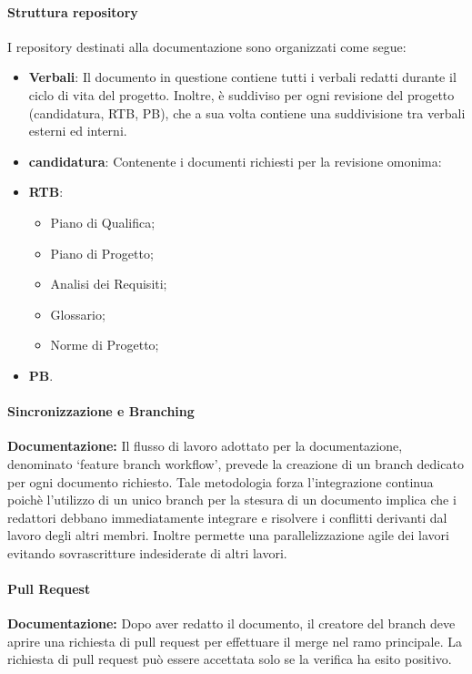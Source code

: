 \documentclass{article}
\begin{document}
 \paragraph{Struttura repository}
 I repository destinati alla documentazione sono organizzati come segue:
\begin{itemize}
    \item \textbf{Verbali}: Il documento in questione contiene tutti i verbali redatti durante il ciclo di vita del progetto. Inoltre, è suddiviso per ogni revisione del progetto (candidatura, RTB, PB), che a sua volta contiene una suddivisione tra verbali esterni ed interni.
    \item \textbf{candidatura}: Contenente i documenti richiesti per la revisione omonima:
    \item \textbf{RTB}:\begin{itemize}
        \item Piano di Qualifica;
        \item Piano di Progetto;
        \item Analisi dei Requisiti;
        \item Glossario;
        \item Norme di Progetto;
    \end{itemize}
    \item \textbf{PB}.
\end{itemize}


\paragraph{Sincronizzazione e Branching}
\textbf{Documentazione:}
Il flusso di lavoro adottato per la documentazione, denominato ‘feature branch workflow’, prevede la creazione di un branch dedicato per ogni documento richiesto.
Tale metodologia forza l'integrazione continua poichè l'utilizzo di un unico branch per la stesura di un documento implica che i redattori debbano immediatamente integrare e risolvere i conflitti derivanti dal lavoro degli altri membri.
Inoltre permette una parallelizzazione agile dei lavori evitando sovrascritture indesiderate di altri lavori.

\paragraph{Pull Request}
\textbf{Documentazione:}
Dopo aver redatto il documento, il creatore del branch deve aprire una richiesta di pull request per effettuare il merge nel ramo principale. La richiesta di pull request può essere accettata solo se la verifica ha esito positivo.
\end{document}
